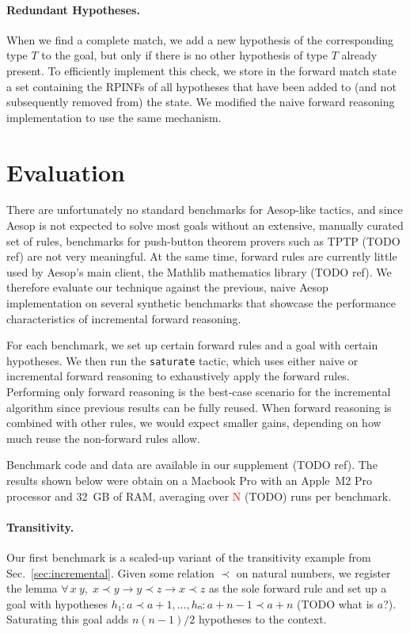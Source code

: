 \documentclass[runningheads]{llncs}
\newcommand{\All}[2]{\ensuremath{\forall\, #1,\; #2}}
\begin{document}
\paragraph{Redundant Hypotheses.}
When we find a complete match, we add a new hypothesis of the corresponding type $T$ to the goal, but only if there is no other hypothesis of type $T$ already present.
To efficiently implement this check, we store in the forward match state a set containing the RPINFs of all hypotheses that have been added to (and not subsequently removed from) the state.
We modified the naive forward reasoning implementation to use the same mechanism.

\section{Evaluation}%
\label{sec:evaluation}

There are unfortunately no standard benchmarks for Aesop-like tactics, and since Aesop is not expected to solve most goals without an extensive, manually curated set of rules, benchmarks for push-button theorem provers such as TPTP (TODO ref) are not very meaningful.
At the same time, forward rules are currently little used by Aesop's main client, the Mathlib mathematics library (TODO ref).
We therefore evaluate our technique against the previous, naive Aesop implementation on several synthetic benchmarks that showcase the performance characteristics of incremental forward reasoning.

For each benchmark, we set up certain forward rules and a goal with certain hypotheses.
We then run the \texttt{saturate} tactic, which uses either naive or incremental forward reasoning to exhaustively apply the forward rules.
Performing only forward reasoning is the best-case scenario for the incremental algorithm since previous results can be fully reused.
When forward reasoning is combined with other rules, we would expect smaller gains, depending on how much reuse the non-forward rules allow.

Benchmark code and data are available in our supplement (TODO ref).
The results shown below were obtain on a Macbook Pro with an Apple~M2 Pro processor and \SI{32}{GB} of RAM, averaging over \textcolor{red}{N} (TODO) runs per benchmark.

\paragraph{Transitivity.}
Our first benchmark is a scaled-up variant of the transitivity example from Sec.~\ref{sec:incremental}.
Given some relation $≺$ on natural numbers, we register the lemma $\All{x~y}{x ≺ y → y ≺ z → x ≺ z}$ as the sole forward rule and set up a goal with hypotheses $h₁ : a ≺ a + 1, \dots, hₙ : a + n - 1 ≺ a + n$ (TODO what is $a$?).
Saturating this goal adds $n(n-1)/2$ hypotheses to the context.
\end{document}
